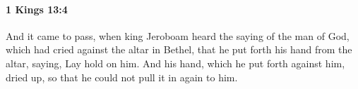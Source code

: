 
		\paragraph{1 Kings 13:4} %
			\label{1KINGS-13-4}

			And it came to pass, when king Jeroboam heard the saying of the man of God, which had cried against the altar in Bethel, that he put forth his hand from the altar, saying, Lay hold on him. And his hand, which he put forth against him, dried up, so that he could not pull it in again to him.



